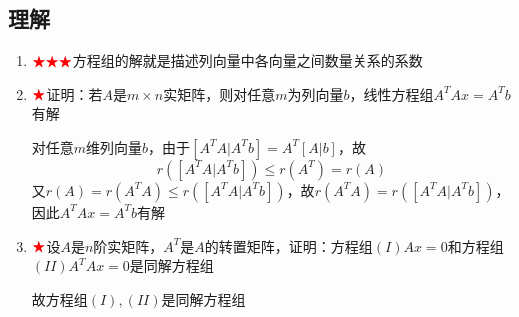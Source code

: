 \documentclass[./linear_algebra.tex]{subfiles}
\begin{document}
    \subsection{理解}

    \begin{enumerate}
        \item $\color{red}{\bigstar\bigstar\bigstar}$方程组的解就是描述列向量中各向量之间数量关系的系数
        \item $\color{red}{\bigstar}$证明：若$A$是$m\times n$实矩阵，则对任意$m$为列向量$b$，线性方程组$A^{T}Ax = A^{T}b$有解
        \begin{analysisbox}
            对任意$m$维列向量$b$，由于$[A^{T}A|A^{T}b] = A^T[A|b]$，故
            \[
                r([A^{T}A|A^{T}b]) \leq r(A^T) = r(A)
            \]
            又$r(A) = r(A^TA) \leq r([A^{T}A|A^{T}b])$，故$r(A^{T}A) = r([A^{T}A|A^{T}b])$，因此$A^{T}Ax = A^{T}b$有解
        \end{analysisbox}
        \item $\color{red}{\bigstar}$设$A$是$n$阶实矩阵，$A^T$是$A$的转置矩阵，证明：方程组$(I) Ax = 0$和方程组$(II) A^{T}Ax = 0$是同解方程组
        \begin{analysisbox}
            故方程组$(I), (II)$是同解方程组
        \end{analysisbox}
    \end{enumerate}
\end{document}
